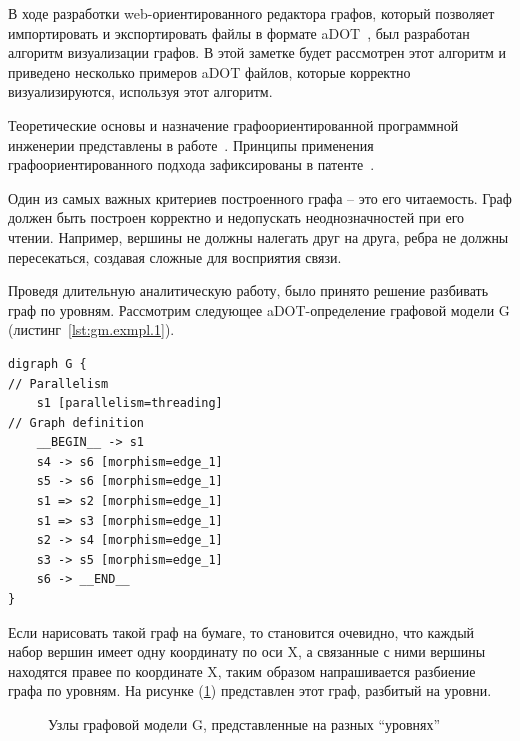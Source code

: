 \def\notedate{2021.12.04}
\def\currentauthor{Ершов В. (РК6-72Б)}

В ходе разработки web-ориентированного редактора графов, который позволяет импортировать и экспортировать файлы в формате aDOT~\cite{SokADOT}, был разработан алгоритм визуализации графов. В этой заметке будет рассмотрен этот алгоритм и приведено несколько примеров aDOT файлов, которые корректно визуализируются, используя этот алгоритм.

Теоретические основы и назначение графоориентированной программной инженерии представлены в работе~\cite{SokPersh2018GBSE}. Принципы применения графоориентированного подхода зафиксированы в патенте~\cite{patentRU2681408}. 

Один из самых важных критериев построенного графа -- это его читаемость. Граф должен быть построен корректно и недопускать неоднозначностей при его чтении. Например, вершины не должны налегать друг на друга, ребра не должны пересекаться, создавая сложные для восприятия связи.

Проведя длительную аналитическую работу, было принято решение разбивать граф по уровням. Рассмотрим следующее aDOT-определение графовой модели \textsf{G} (листинг~\ref{lst:gm.exmpl.1}).

\begin{lstlisting}[frame=single, label={lst:gm.exmpl.1}, caption={Пример aDOT-определение простейшей графовой модели \textsf{G}}, language=aDOTExample]
digraph G {
// Parallelism
	s1 [parallelism=threading]
// Graph definition
	__BEGIN__ -> s1
	s4 -> s6 [morphism=edge_1]
	s5 -> s6 [morphism=edge_1]
	s1 => s2 [morphism=edge_1]
	s1 => s3 [morphism=edge_1]
	s2 -> s4 [morphism=edge_1]
	s3 -> s5 [morphism=edge_1]
	s6 -> __END__ 
}
\end{lstlisting}

Если нарисовать такой граф на бумаге, то становится очевидно, что каждый набор вершин имеет одну координату по оси X, а связанные с ними вершины находятся правее по координате X, таким образом напрашивается разбиение графа по уровням. На рисунке (\ref{fig:graph_levels}) представлен этот граф, разбитый на уровни.

\begin{figure}[ht!]
\caption{Узлы графовой модели \textsf{G}, представленные на разных ``уровнях''}
\label{fig:graph_levels}
\end{figure}


